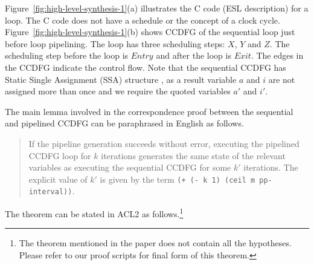 Figure~\ref{fig:high-level-synthesis-1}(a) illustrates the C
code (ESL description) for a loop.  The C code does not have
a schedule or the concept of a clock cycle.
Figure~\ref{fig:high-level-synthesis-1}(b) shows CCDFG of the
sequential loop just before loop pipelining. The loop has
three scheduling steps: $X$, $Y$ and $Z$.  The scheduling
step before the loop is $Entry$ and after the loop is
$Exit$. The edges  in the CCDFG indicate the control flow.
Note that the sequential CCDFG has Static Single Assignment (SSA) structure
, as a result variable $a$ and $i$ are not assigned 
more than once and we require the quoted variables $a'$ and $i'$.




The main lemma involved in the correspondence proof between
the sequential and pipelined CCDFG can be paraphrased in English as follows. 

\begin{quote}
 If the pipeline generation succeeds without error,
 executing the pipelined CCDFG loop for $k$ iterations
 generates the same state of the relevant variables as
 executing the sequential CCDFG for some $k'$ iterations.
 The explicit value of $k'$ is given by the term {\tt (+ (-
   k 1) (ceil m pp-interval))}.
 \end{quote}

The theorem can be stated in ACL2 as follows.\footnote{The theorem mentioned in the paper does not contain
all the hypotheses. Please refer to our proof scripts
for final form of this theorem.}

